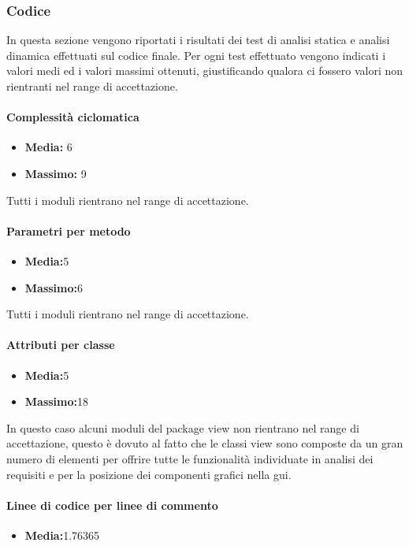 \subsubsection{Codice}
\label{codeRA}
In questa sezione vengono riportati i risultati dei test di analisi statica e analisi dinamica effettuati sul codice finale.
Per ogni test effettuato vengono indicati i valori medi ed i valori massimi ottenuti, giustificando qualora ci fossero valori non rientranti nel range di accettazione.
\paragraph{Complessità ciclomatica}
\begin{itemize}
\item{\textbf{Media:} 6} 
\item{\textbf{Massimo:} 9}
\end{itemize}
Tutti i moduli rientrano nel range di accettazione.

\paragraph{Parametri per metodo}
\begin{itemize}
\item{\textbf{Media:}5} 
\item{\textbf{Massimo:}6} 
\end{itemize}
Tutti i moduli rientrano nel range di accettazione.

\paragraph{Attributi per classe}
\begin{itemize}
\item{\textbf{Media:}5} 
\item{\textbf{Massimo:}18} 
\end{itemize}
In questo caso alcuni moduli del package view non rientrano nel range di accettazione, questo è dovuto al fatto che le classi view sono composte da un gran numero di elementi per offrire tutte le funzionalità individuate in analisi dei requisiti e per la posizione dei componenti grafici nella gui\g{}.

\paragraph{Linee di codice per linee di commento}
\begin{itemize}
\item{\textbf{Media:}}1.76365 
\end{itemize}

